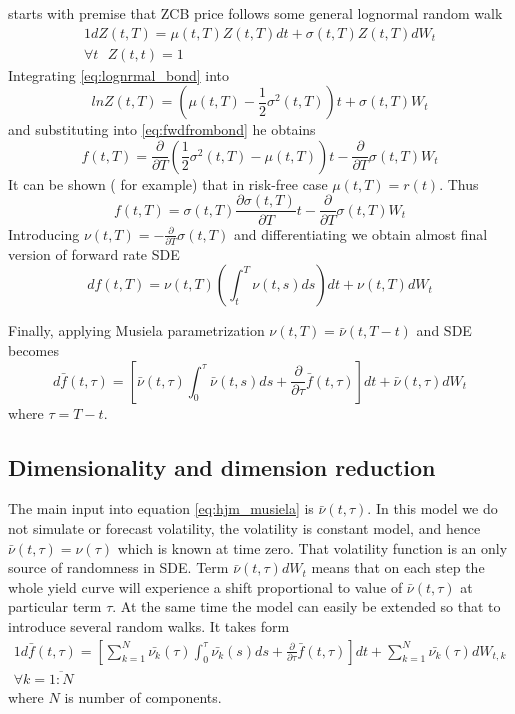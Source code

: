 \documentclass[11pt]{article} %
\begin{document}
\cite[ch. 37]{PWoQF06} starts with premise that ZCB price follows some general lognormal random walk
\begin{alignat}{1} \label{eq:lognrmal_bond}
dZ(t,T) = \mu(t,T)Z(t,T)dt + \sigma(t,T)Z(t,T)dW_{t}\\
\forall t \text{ } Z(t,t) = 1 \nonumber
\end{alignat}
Integrating  \eqref{eq:lognrmal_bond} into 
\begin{equation}
lnZ(t,T) = \left(\mu(t,T)-  \frac{1}{2}\sigma^2(t,T)\right)t +\sigma(t,T)W_{t}
\end{equation}
and substituting into \eqref{eq:fwdfrombond} he obtains
\begin{equation}
f(t,T) = \frac{\partial}{\partial T}\left(\frac{1}{2}\sigma ^2(t,T) - \mu(t,T)\right) t-\frac{\partial}{\partial T}\sigma(t,T)W_{t}
\end{equation}
It can be shown (\cite[par. 10.3.2]{Shreve08} for example) that in risk-free case $\mu(t,T) = r(t)$. Thus 
\begin{equation}
f(t,T) = \sigma(t,T)\frac{\partial \sigma(t,T)}{\partial T}t-\frac{\partial}{\partial T}\sigma(t,T)W_{t}
\end{equation}
Introducing $\nu(t,T) = -\frac{\partial}{\partial T}\sigma(t,T)$ and differentiating we obtain almost final version of forward rate SDE
\begin{equation}
df(t,T) = \nu(t,T)\left(\int_{t}^{T}\nu(t,s)ds\right)dt + \nu(t,T)dW_{t} \nonumber
\end{equation} 

Finally, applying Musiela parametrization $\nu(t,T) = \bar{\nu}(t,T-t)$ and SDE becomes
\begin{equation} \label{eq:hjm_musiela}
d\bar{f}(t,\tau) = \left[\bar{\nu}(t,\tau)\int_{0}^{\tau}\bar{\nu}(t,s)ds+ \frac{\partial}{\partial \tau}\bar{f}(t,\tau)\right]dt + \bar{\nu}(t,\tau)dW_{t} 
\end{equation}
where $\tau = T-t$.

\subsection{Dimensionality and dimension reduction}
The main input into equation \eqref{eq:hjm_musiela} is $\bar{\nu}(t,\tau)$. In this model we do not simulate or forecast volatility, the volatility is constant model, and hence $\bar{\nu}(t,\tau) = \nu(\tau)$ which is known at time zero. That volatility function is an only source of randomness in SDE. Term $\bar{\nu}(t,\tau)dW_t$ means that on each step the whole yield curve will experience a shift proportional to value of $\bar{\nu}(t,\tau)$ at particular term $\tau$. At the same time the model can easily be extended so that to introduce several random walks. It takes form
\begin{alignat}{1} \label{eq:hjm_musiela_multidim}
d\bar{f}(t,\tau) = \left[\sum_{k=1}^N\bar{\nu_k}(\tau)\int_{0}^{\tau}\bar{\nu_k}(s)ds+ \frac{\partial}{\partial \tau}\bar{f}(t,\tau)\right]dt + \sum_{k=1}^N\bar{\nu_k}(\tau)dW_{t, k}\\
\forall k = \overline{1:N} \nonumber
\end{alignat}
where $N$ is number of components.
\end{document}
